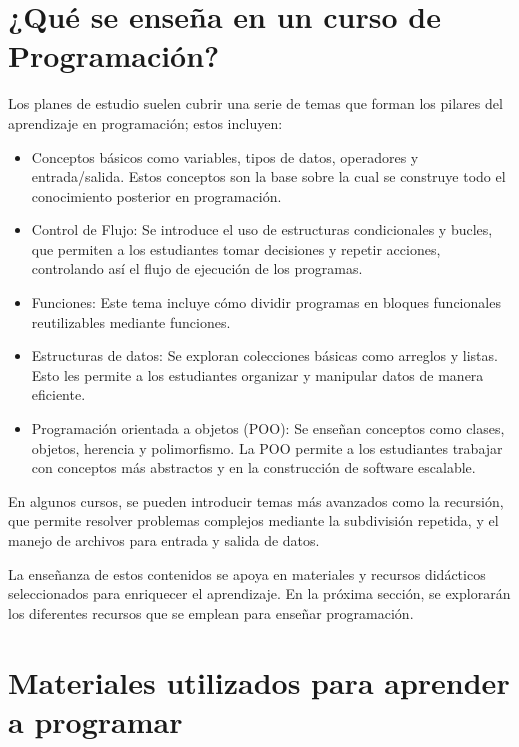 \documentclass{article}
\begin{document}
\section{¿Qué se enseña en un curso de Programación?}\label{sec:contents}

Los planes de estudio  suelen cubrir una serie de temas que forman los pilares del aprendizaje en programación; estos incluyen:

\begin{itemize} 
    \item Conceptos básicos como variables, tipos de datos, operadores y entrada/salida. Estos conceptos son la base sobre la cual se construye todo el conocimiento posterior en programación.
    \item Control de Flujo: 
    Se introduce el uso de estructuras condicionales y bucles, que permiten a los estudiantes tomar decisiones y repetir acciones, controlando así el flujo de ejecución de los programas.
    \item Funciones: 
    Este tema incluye cómo dividir programas en bloques funcionales reutilizables mediante funciones.
    \item Estructuras de datos: 
    Se exploran colecciones básicas como arreglos y listas. Esto les permite a los estudiantes organizar y manipular datos de manera eficiente.
    \item Programación orientada a objetos (POO): 
    Se enseñan conceptos como clases, objetos, herencia y polimorfismo. La POO permite a los estudiantes trabajar con conceptos más abstractos y en la construcción de software escalable.
\end{itemize}

En algunos cursos, se pueden introducir temas más avanzados como la recursión, que permite resolver problemas complejos mediante la subdivisión repetida, y el manejo de archivos para entrada y salida de datos.

La enseñanza de estos contenidos se apoya en materiales y recursos didácticos seleccionados para enriquecer el aprendizaje. En la próxima sección, se explorarán los diferentes recursos que se emplean para enseñar programación.

\section{Materiales utilizados para aprender a programar}\label{sec:resources}
\end{document}
